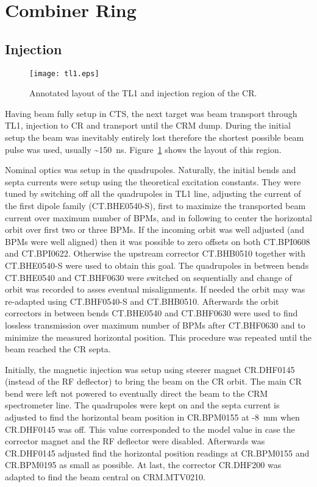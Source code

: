 \section{Combiner Ring}
\subsection{Injection}

\begin{figure}
\begin{center}
  \texttt{[image: tl1.eps]}
  \caption{Annotated layout of the TL1 and injection region of the CR.}
\label{fig:tl1elements}
\end{center}
\end{figure}


Having beam fully setup in CTS, the next target was beam transport through
\ac{TL1}, injection to \ac{CR} and transport until the \ac{CRM} dump. 
During the initial setup the beam was inevitably entirely lost
therefore the shortest possible beam pulse was used, usually \textasciitilde 150~ns.
Figure~\ref{fig:tl1elements} shows the layout of this region.

Nominal optics was setup in the quadrupoles. 
Naturally, the initial bends and septa currents were setup using the theoretical excitation constants. 
They were tuned by switching off all the quadrupoles in \ac{TL1} line, adjusting the current 
of the first dipole family (CT.BHE0540-S), first to maximize 
the transported beam current over maximum number of BPMs, 
and in following to center the horizontal orbit over first two or three BPMs.
If the incoming orbit was well adjusted (and BPMs were well aligned) then it was possible to 
zero offsets on both CT.BPI0608 and CT.BPI0622. Otherwise the upstream corrector CT.BHB0510
together with CT.BHE0540-S were used to obtain this goal.
The quadrupoles in between bends CT.BHE0540 and CT.BHF0630 were switched on sequentially and 
change of orbit was recorded to asses eventual misalignments. 
If needed the orbit may was re-adapted using CT.BHF0540-S and CT.BHB0510. 
Afterwards the orbit correctors in between 
bends CT.BHE0540 and CT.BHF0630 were used to find lossless transmission over maximum
number of BPMs after CT.BHF0630 and to minimize the measured horizontal position.
This procedure was repeated until the beam reached the CR septa.


Initially, the magnetic injection was setup using steerer magnet CR.DHF0145 
(instead of the RF deflector) to bring the beam on the \ac{CR} orbit.
The main CR bend were left not powered to eventually direct the beam to the \ac{CRM} spectrometer line.
The quadrupoles were kept on and the septa current is adjusted to find
the horizontal beam position in CR.BPM0155 at -8~mm  when CR.DHF0145 was off.
This value corresponded to the model value in case the corrector magnet and the RF deflector were disabled.
Afterwards was CR.DHF0145 adjusted find the horizontal position readings at 
CR.BPM0155 and CR.BPM0195 as small as possible. At last, the corrector CR.DHF200 
was adapted to find the beam central on CRM.MTV0210.
 

